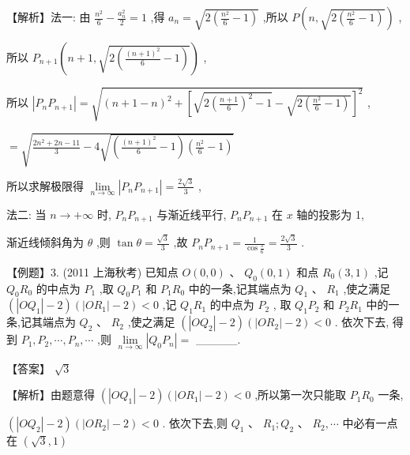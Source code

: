 \documentclass[10pt]{article}
\begin{document}
【解析】法一: 由 \(\frac{{n}^{2}}{6} - \frac{{a}_{n}^{2}}{2} = 1\) ,得 \({a}_{n} = \sqrt{2\left( {\frac{{n}^{2}}{6} - 1}\right) }\) ,所以 \(P\left( {n,\sqrt{2\left( {\frac{{n}^{2}}{6} - 1}\right) }}\right)\) ,

所以 \({P}_{n + 1}\left( {n + 1,\sqrt{2\left( {\frac{{\left( n + 1\right) }^{2}}{6} - 1}\right) }}\right)\) ,

所以 \(\left| {{P}_{n}{P}_{n + 1}}\right|  = \sqrt{{\left( n + 1 - n\right) }^{2} + {\left\lbrack  \sqrt{2{\left( \frac{n + 1}{6}\right) }^{2} - 1} - \sqrt{2\left( {\frac{{n}^{2}}{6} - 1}\right) }\right\rbrack  }^{2}}\) ,

\(= \sqrt{\frac{2{n}^{2} + {2n} - {11}}{3} - 4\sqrt{\left( {\frac{{\left( n + 1\right) }^{2}}{6} - 1}\right) \left( {\frac{{n}^{2}}{6} - 1}\right) }}\)

所以求解极限得 \(\mathop{\lim }\limits_{{n \rightarrow  \infty }}\left| {{P}_{n}{P}_{n + 1}}\right|  = \frac{2\sqrt{3}}{3}\) ,

法二: 当 \(n \rightarrow   + \infty\) 时, \({P}_{n}{P}_{n + 1}\) 与渐近线平行, \({P}_{n}{P}_{n + 1}\) 在 \(x\) 轴的投影为 1,

渐近线倾斜角为 \(\theta\) ,则 \(\tan \theta  = \frac{\sqrt{3}}{3}\) ,故 \({P}_{n}{P}_{n + 1} = \frac{1}{\cos \frac{\pi }{6}} = \frac{2\sqrt{3}}{3}\) .

【例题】3. (2011 上海秋考) 已知点 \(O\left( {0,0}\right) \text{ 、 }{Q}_{0}\left( {0,1}\right)\) 和点 \({R}_{0}\left( {3,1}\right)\) ,记 \({Q}_{0}{R}_{0}\) 的中点为 \({P}_{1}\) ,取 \({Q}_{0}{P}_{1}\) 和 \({P}_{1}{R}_{0}\) 中的一条,记其端点为 \({Q}_{1}\text{ 、 }{R}_{1}\) ,使之满足 \(\left( {\left| {O{Q}_{1}}\right|  - 2}\right) \left( {\left| {O{R}_{1}}\right|  - 2}\right)  < 0\) ,记 \({Q}_{1}{R}_{1}\) 的中点为 \({P}_{2}\) , 取 \({Q}_{1}{P}_{2}\) 和 \({P}_{2}{R}_{1}\) 中的一条,记其端点为 \({Q}_{2}\text{ 、 }{R}_{2}\) ,使之满足 \(\left( {\left| {O{Q}_{2}}\right|  - 2}\right) \left( {\left| {O{R}_{2}}\right|  - 2}\right)  < 0\) . 依次下去, 得到 \({P}_{1},{P}_{2},\cdots ,{P}_{n},\cdots\) ,则 \(\mathop{\lim }\limits_{{n \rightarrow  \infty }}\left| {{Q}_{0}{P}_{n}}\right|  =\) \_\_\_\_\_.

【答案】 \(\sqrt{3}\)

【解析】由题意得 \(\left( {\left| {O{Q}_{1}}\right|  - 2}\right) \left( {\left| {O{R}_{1}}\right|  - 2}\right)  < 0\) ,所以第一次只能取 \({P}_{1}{R}_{0}\) 一条,

\(\left( {\left| {O{Q}_{2}}\right|  - 2}\right) \left( {\left| {O{R}_{2}}\right|  - 2}\right)  < 0\) . 依次下去,则 \({Q}_{1}\text{ 、 }{R}_{1};{Q}_{2}\text{ 、 }{R}_{2},\cdots\) 中必有一点在 \(\left( {\sqrt{3},1}\right)\)
\end{document}
